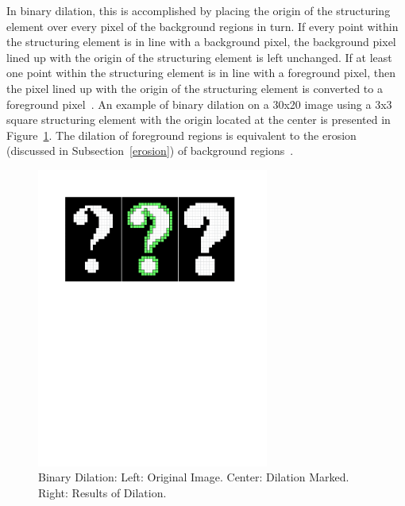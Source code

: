 \documentclass{sig-alternate}
\begin{document}
In binary dilation, this is accomplished by placing the origin of the structuring element over every pixel of the background regions in turn. If every point within the structuring element is in line with a background pixel, the background pixel lined up with the origin of the structuring element is left unchanged. If at least one point within the structuring element is in line with a foreground pixel, then the pixel lined up with the origin of the structuring element is converted to a foreground pixel~\cite{MorphologyWiki}. An example of binary dilation on a 30x20 image using a 3x3 square structuring element with the origin located at the center is presented in Figure~\ref{binary dilation figure}. The dilation of foreground regions is equivalent to the erosion (discussed in Subsection~\ref{erosion}) of background regions~\cite{MorphologyWiki}.
\begin{figure}
\centering
\includegraphics[width=3in,trim={0 6.75in 0 0},clip]{dilation}
\caption{Binary Dilation: Left: Original Image. Center: Dilation Marked. Right: Results of Dilation.}
\label{binary dilation figure}
\end{figure}
\end{document}

